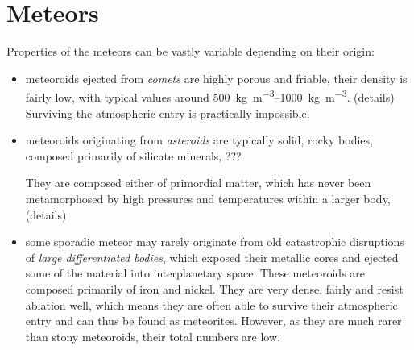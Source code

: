\section{Meteors} \label{al}
    Properties of the meteors can be vastly variable depending on their origin:
    \begin{itemize}
        \item meteoroids ejected from \emph{comets} are highly porous and friable,
            their density is fairly low, with typical values around \SIrange{500}{1000}{\kilo\gram\per\cubic\metre}.
            (details)
            Surviving the atmospheric entry is practically impossible.
        \item meteoroids originating from \emph{asteroids} are typically solid,
            rocky bodies, composed primarily of silicate minerals, ???

            They are composed either of primordial matter, which has never been metamorphosed by high pressures
            and temperatures within a larger body,
            (details)
        \item some sporadic meteor may rarely originate from old catastrophic disruptions
            of \emph{large differentiated bodies}, which exposed their metallic cores
            and ejected some of the material into interplanetary space.
            These meteoroids are composed primarily of iron and nickel.
            They are very dense, fairly  and resist ablation well,
            which means they are often able to survive their atmospheric
            entry and can thus be found as meteorites.
            However, as they are much rarer than stony meteoroids,
            their total numbers are low.
    \end{itemize}
